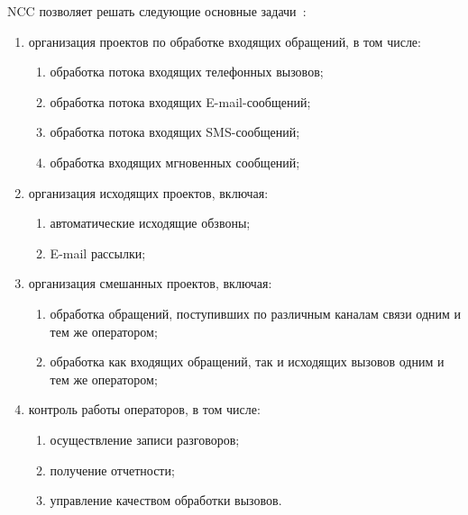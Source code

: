 NCC позволяет решать следующие основные задачи~\cite{doc:about}:
\begin{enumerate}
    \item организация проектов по обработке входящих обращений, в том числе:
    \begin{enumerate}
        \item обработка потока входящих телефонных вызовов;
        \item обработка потока входящих E-mail-сообщений;
        \item обработка потока входящих SMS-сообщений;
        \item обработка входящих мгновенных сообщений;
    \end{enumerate}
    \item организация исходящих проектов, включая:
    \begin{enumerate}
        \item автоматические исходящие обзвоны;
        \item E-mail рассылки;
    \end{enumerate}
    \item организация смешанных проектов, включая:
    \begin{enumerate}
        \item обработка обращений, поступивших по различным каналам связи одним и тем же оператором;
        \item обработка как входящих обращений, так и исходящих вызовов одним и тем же оператором;
    \end{enumerate}
    \item контроль работы операторов, в том числе:
    \begin{enumerate}
        \item осуществление записи разговоров;
        \item получение отчетности;
        \item управление качеством обработки вызовов.
    \end{enumerate}
\end{enumerate}


